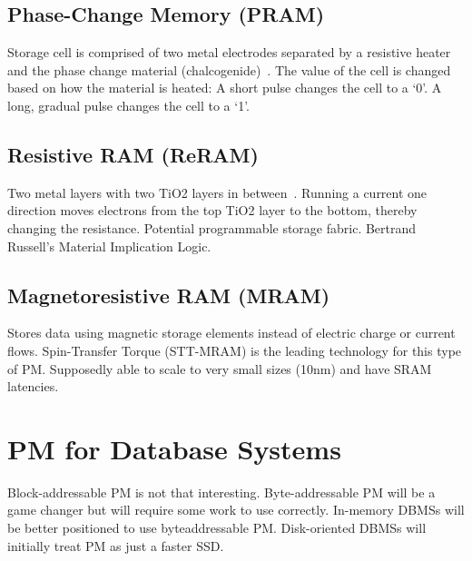 \documentclass[11pt]{article}
\begin{document}
\subsection*{Phase-Change Memory (PRAM)}
Storage cell is comprised of two metal electrodes separated by a resistive heater and the phase change material (chalcogenide)~\cite{Lee2010}. The value of the cell is changed based on how the material is heated: A short pulse changes the cell to a ‘0’. A long, gradual pulse changes the cell to a ‘1’.

\subsection*{Resistive RAM (ReRAM)}
Two metal layers with two TiO2 layers in between~\cite{Williams2008}. Running a current one direction moves electrons from the top TiO2 layer to the bottom, thereby changing the resistance. Potential programmable storage fabric. Bertrand Russell’s Material Implication Logic.

\subsection*{Magnetoresistive RAM (MRAM)}
Stores data using magnetic storage elements instead of electric charge or current flows. Spin-Transfer Torque (STT-MRAM) is the leading technology for this type of PM. Supposedly able to scale to very small sizes (10nm) and have SRAM latencies.


\section{PM for Database Systems}
Block-addressable PM is not that interesting. Byte-addressable PM will be a game changer but will require some work to use correctly. In-memory DBMSs will be better positioned to use byteaddressable PM. Disk-oriented DBMSs will initially treat PM as just a faster SSD.
\end{document}
